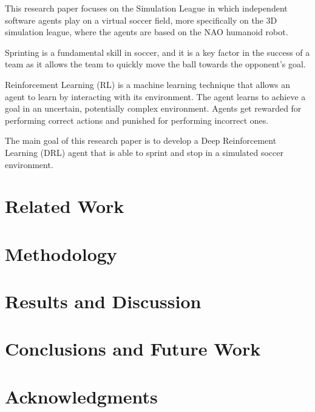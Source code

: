 \documentclass[conference]{IEEEtran}
\begin{document}
This research paper focuses on the Simulation League in which independent software agents play on a virtual soccer
field, more specifically on the 3D simulation league, where the agents are based on the NAO humanoid robot.

Sprinting is a fundamental skill in soccer, and it is a key factor in the success of a team as it allows
the team to quickly move the ball towards the opponent's goal.

Reinforcement Learning (RL) is a machine learning technique that allows an agent to learn by
interacting with its environment. The agent learns to achieve a goal in an uncertain,
potentially complex environment. Agents get rewarded for performing correct actions and punished for
performing incorrect ones.

The main goal of this research paper is to develop a Deep Reinforcement Learning (DRL) agent
that is able to sprint and stop in a simulated soccer environment.


\section{Related Work}

\section{Methodology}

\section{Results and Discussion}

\section{Conclusions and Future Work}

\section{Acknowledgments}
\end{document}
